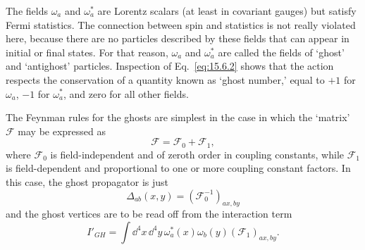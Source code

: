 The fields $\omega_a$ and $\omega_a^*$ are Lorentz scalars (at least
in covariant gauges) but satisfy Fermi statistics. The connection between spin
and statistics is not really violated here, because there are no particles
described by these fields that can appear in initial or final states. For that
reason, $\omega_a$ and $\omega_a^*$ are called the fields of `ghost'
and `antighost' particles. Inspection of Eq.~\eqref{eq:15.6.2} shows that the
action respects the conservation of a quantity known as `ghost number,' equal
to $+1$ for $\omega_a$, $-1$ for $\omega_a^*$, and zero for all other
fields.

The Feynman rules for the ghosts are simplest in the case in which the
`matrix' $\mathcal F$ may be expressed as
\begin{equation}
  \mathcal F=\mathcal F_0+\mathcal F_1,
  \tag{15.6.5}\label{eq:15.6.5}
\end{equation}
where $\mathcal F_0$ is field-independent and of zeroth order in coupling
constants, while $\mathcal F_1$ is field-dependent and proportional to one or
more coupling constant factors. In this case, the ghost propagator is just
\begin{equation}
  \Delta_{ab}(x,y)
  =(\mathcal F_0^{-1})_{a x,b y}
  \tag{15.6.6}\label{eq:15.6.6}
\end{equation}
and the ghost vertices are to be read off from the interaction term
\begin{equation}
  I'_{GH}=\int \dd^4x\,\dd^4y\,
  \omega_a^*(x)\omega_b(y)(\mathcal F_1)_{a x,b y}.
  \tag{15.6.7}\label{eq:15.6.7}
\end{equation}

